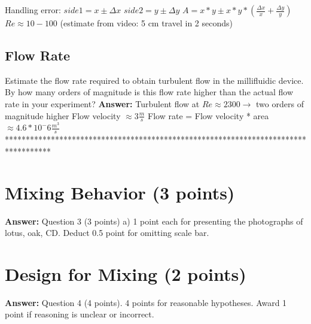 \documentclass[12pt]{article}%
\begin{document}
\noindent [0.5] Handling error:
\newline
$side1 = x \pm \Delta x$
\newline
$side2 = y \pm \Delta y$
\newline
$A = x * y \pm x*y*(\frac{\Delta x}{x} + \frac{\Delta y}{y})$
\newline
\newline
[0.5] $Re \approx 10-100$ (estimate from video: 5 cm travel in 2 seconds) 
\newline

\subsection{Flow Rate}
Estimate the flow rate required to obtain turbulent flow in the millifluidic device. By how many orders of magnitude is this flow rate higher than the actual flow rate in your experiment?
\newline
\newline
\textbf{Answer:}
\newline
\newline
Turbulent flow at $Re \approx 2300 \rightarrow$ two orders of magnitude higher
\newline
\newline
[0.5] Flow velocity $\approx 3 \frac{m}{s}$
\newline
\newline
[0.5] Flow rate = Flow velocity * area $\approx 4.6 *10^-6 \frac{m^3}{s}$
\newline
\newline
***********************************************************************************
\section{Mixing Behavior (3 points)}

\textbf{Answer:}
Question 3 (3 points)
a)	1 point each for presenting the photographs of lotus, oak, CD. Deduct 0.5 point for omitting scale bar.
\newline
\newline

\section{Design for Mixing (2 points)}

\textbf{Answer:}
Question 4 (4 points). 4 points for reasonable hypotheses. Award 1 point if reasoning is unclear or incorrect.
\newline
\newline
\end{document}
